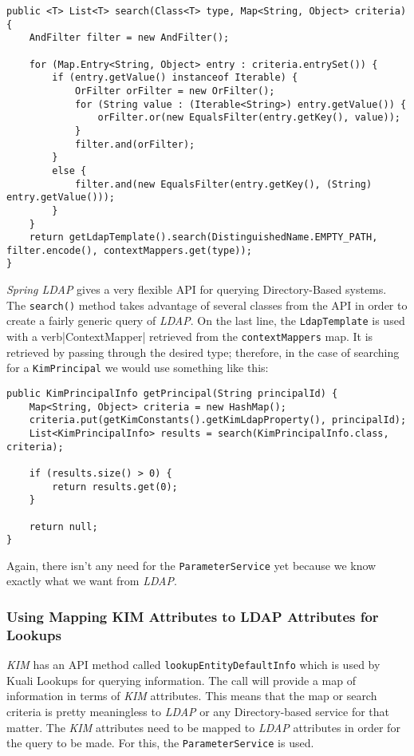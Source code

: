 \documentclass[12pt,notitlepage]{article}
\begin{document}
\begin{lstlisting}
public <T> List<T> search(Class<T> type, Map<String, Object> criteria) {
    AndFilter filter = new AndFilter();
    
    for (Map.Entry<String, Object> entry : criteria.entrySet()) {
        if (entry.getValue() instanceof Iterable) {
            OrFilter orFilter = new OrFilter();
            for (String value : (Iterable<String>) entry.getValue()) {
                orFilter.or(new EqualsFilter(entry.getKey(), value));
            }
            filter.and(orFilter);
        }
        else {
            filter.and(new EqualsFilter(entry.getKey(), (String) entry.getValue()));
        }
    }
    return getLdapTemplate().search(DistinguishedName.EMPTY_PATH, filter.encode(), contextMappers.get(type));
}
\end{lstlisting}

\emph{Spring LDAP} gives a very flexible API for querying Directory-Based systems. The \verb|search()| method
takes advantage of several classes from the API in order to create a fairly generic query of \emph{LDAP}. On the 
last line, the \verb|LdapTemplate| is used with a verb|ContextMapper| retrieved from the \verb|contextMappers|
map. It is retrieved by passing through the desired type; therefore, in the case of searching for a \verb|KimPrincipal|
we would use something like this:

\begin{lstlisting}
public KimPrincipalInfo getPrincipal(String principalId) {
    Map<String, Object> criteria = new HashMap();
    criteria.put(getKimConstants().getKimLdapProperty(), principalId);
    List<KimPrincipalInfo> results = search(KimPrincipalInfo.class, criteria);

    if (results.size() > 0) {
        return results.get(0);
    }
    
    return null;
}
\end{lstlisting}
Again, there isn't any need for the \verb|ParameterService| yet because we know exactly what we want from 
\emph{LDAP}.

\subsubsection{Using Mapping KIM Attributes to LDAP Attributes for Lookups}
\emph{KIM} has an API method called \verb|lookupEntityDefaultInfo| which is used by Kuali Lookups for 
querying information. The call will provide a map of information in terms of \emph{KIM} attributes. This
means that the map or search criteria is pretty meaningless to \emph{LDAP} or any Directory-based service
for that matter. The \emph{KIM} attributes need to be mapped to \emph{LDAP} attributes in order for the
query to be made. For this, the \verb|ParameterService| is used.
\end{document}
